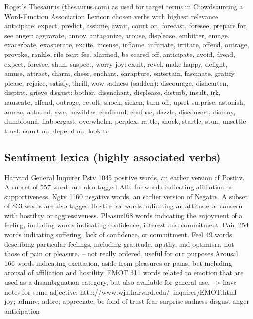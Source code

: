 Roget's Thesaurus (thesaurus.com)
as used for target terms in Crowdsourcing a Word-Emotion Association Lexicon
chosen verbs with highest relevance
anticipate: expect, predict, assume, await, count on, forecast, foresee, prepare for, see
anger: aggravate, annoy, antagonize, arouse, displease, embitter, enrage, exacerbate, exasperate, excite, incense, inflame, infuriate, irritate, offend, outrage, provoke, rankle, rile
fear: feel alarmed, be scared off, anticipate, avoid, dread, expect, foresee, shun, suspect, worry
joy: exult, revel, make happy, delight, amuse, attract, charm, cheer, enchant, enrapture, entertain, fascinate, gratify, please, rejoice, satisfy, thrill, wow
sadness (sadden): discourage, dishearten, dispirit, grieve
disgust: bother, disenchant, displease, disturb, insult, irk, nauseate, offend, outrage, revolt, shock, sicken, turn off, upset
surprise: astonish, amaze, astound, awe, bewilder, confound, confuse, dazzle, disconcert, dismay, dumbfound, flabbergast, overwhelm, perplex, rattle, shock, startle, stun, unsettle
trust: count on, depend on, look to



\subsection{Sentiment lexica (highly associated verbs)}

Harvard General Inquirer
Pstv 1045 positive words, an earlier version of Positiv.
A subset of 557 words are also tagged Affil for words indicating affiliation or supportiveness.
Ngtv 1160 negative words, an earlier version of Negativ.
A subset of 833 words are also tagged Hostile for words indicating an attitude or concern with hostility or aggressiveness.
Pleasur168 words indicating the enjoyment of a feeling, including words indicating confidence, interest and commitment.
Pain 254 words indicating suffering, lack of confidence, or commitment.
Feel 49 words describing particular feelings, including gratitude, apathy, and optimism, not those of pain or pleasure.
-- not really ordered, useful for our purposes
Arousal 166 words indicating excitation, aside from pleasures or pains, but including arousal of affiliation and hostility.
EMOT 311 words related to emotion that are used as a disambiguation category, but also available for general use.
--> have notes for some adjective: http://www.wjh.harvard.edu/~inquirer/EMOT.html
joy; admire; adore; appreciate; be fond of
trust
fear
surprise
sadness
disgust
anger
anticipation

